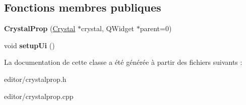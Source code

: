 \subsection*{Fonctions membres publiques}
\begin{DoxyCompactItemize}
\item 
\hypertarget{classCrystalProp_a47068eadccacdada66efdec58235ce94}{{\bfseries Crystal\+Prop} (\hyperlink{classCrystal}{Crystal} $\ast$crystal, Q\+Widget $\ast$parent=0)}\label{classCrystalProp_a47068eadccacdada66efdec58235ce94}

\item 
\hypertarget{classCrystalProp_a042b78a7543d1144f6e3f35881d6446c}{void {\bfseries setup\+Ui} ()}\label{classCrystalProp_a042b78a7543d1144f6e3f35881d6446c}

\end{DoxyCompactItemize}


La documentation de cette classe a été générée à partir des fichiers suivants \+:\begin{DoxyCompactItemize}
\item 
editor/crystalprop.\+h\item 
editor/crystalprop.\+cpp\end{DoxyCompactItemize}
